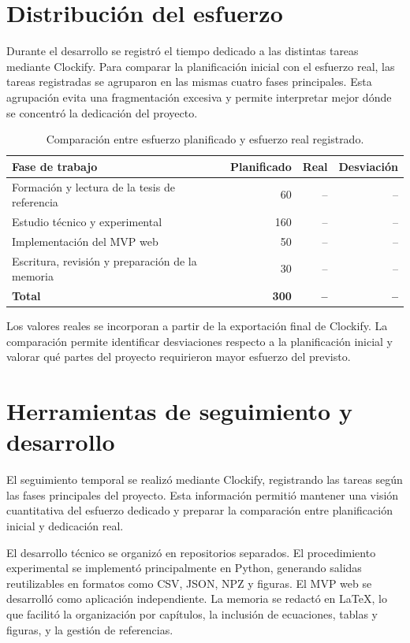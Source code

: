 \section{Distribución del esfuerzo}\label{sec:distribucion-esfuerzo}

Durante el desarrollo se registró el tiempo dedicado a las distintas tareas mediante Clockify. Para comparar la planificación inicial con el esfuerzo real, las tareas registradas se agruparon en las mismas cuatro fases principales. Esta agrupación evita una fragmentación excesiva y permite interpretar mejor dónde se concentró la dedicación del proyecto.

\begin{table}[ht]
\centering
\begin{tabular}{l r r r}
\hline
\textbf{Fase de trabajo} & \textbf{Planificado} & \textbf{Real} & \textbf{Desviación} \\
\hline
Formación y lectura de la tesis de referencia & 60 & -- & -- \\
Estudio técnico y experimental & 160 & -- & -- \\
Implementación del MVP web & 50 & -- & -- \\
Escritura, revisión y preparación de la memoria & 30 & -- & -- \\
\hline
\textbf{Total} & \textbf{300} & \textbf{--} & \textbf{--} \\
\hline
\end{tabular}
\caption{Comparación entre esfuerzo planificado y esfuerzo real registrado.}
\label{tab:distribucion-esfuerzo-real}
\end{table}

Los valores reales se incorporan a partir de la exportación final de Clockify. La comparación permite identificar desviaciones respecto a la planificación inicial y valorar qué partes del proyecto requirieron mayor esfuerzo del previsto.

\section{Herramientas de seguimiento y desarrollo}\label{sec:herramientas-seguimiento}

El seguimiento temporal se realizó mediante Clockify, registrando las tareas según las fases principales del proyecto. Esta información permitió mantener una visión cuantitativa del esfuerzo dedicado y preparar la comparación entre planificación inicial y dedicación real.

El desarrollo técnico se organizó en repositorios separados. El procedimiento experimental se implementó principalmente en Python, generando salidas reutilizables en formatos como CSV, JSON, NPZ y figuras. El MVP web se desarrolló como aplicación independiente. La memoria se redactó en \LaTeX{}, lo que facilitó la organización por capítulos, la inclusión de ecuaciones, tablas y figuras, y la gestión de referencias.

